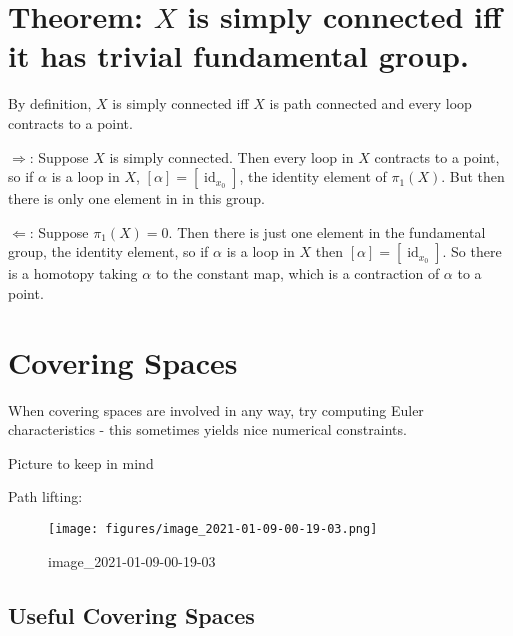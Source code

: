 \hypertarget{theorem-x-is-simply-connected-iff-it-has-trivial-fundamental-group.}{%
\section{\texorpdfstring{Theorem: \(X\) is simply connected iff it has
trivial fundamental
group.}{Theorem: X is simply connected iff it has trivial fundamental group.}}\label{theorem-x-is-simply-connected-iff-it-has-trivial-fundamental-group.}}

By definition, \(X\) is simply connected iff \(X\) is path connected and
every loop contracts to a point.

\(\Rightarrow\): Suppose \(X\) is simply connected. Then every loop in
\(X\) contracts to a point, so if \(\alpha\) is a loop in \(X\),
\([\alpha] = [\operatorname{id}_{x_0}]\), the identity element of
\(\pi_1(X)\). But then there is only one element in in this group.

\(\Leftarrow\): Suppose \(\pi_1(X) = 0\). Then there is just one element
in the fundamental group, the identity element, so if \(\alpha\) is a
loop in \(X\) then \([\alpha] = [\operatorname{id}_{x_0}]\). So there is
a homotopy taking \(\alpha\) to the constant map, which is a contraction
of \(\alpha\) to a point.

\hypertarget{covering-spaces}{%
\section{Covering Spaces}\label{covering-spaces}}

When covering spaces are involved in any way, try computing Euler
characteristics - this sometimes yields nice numerical constraints.

Picture to keep in mind

Path lifting:

\begin{figure}
\centering
\texttt{[image: figures/image\_2021-01-09-00-19-03.png]}
\caption{image\_2021-01-09-00-19-03}
\end{figure}

\hypertarget{useful-covering-spaces}{%
\subsection{Useful Covering Spaces}\label{useful-covering-spaces}}

